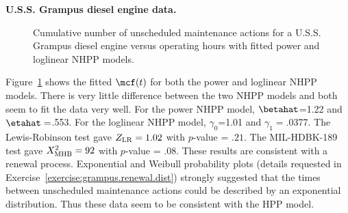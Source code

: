 \begin{example}
\label{example:grampus.nhpp}
{\bf U.S.S. Grampus diesel engine data.}
\begin{figure}
\caption{Cumulative number of unscheduled 
maintenance actions for a U.S.S. Grampus diesel engine versus operating
hours with fitted power and loglinear NHPP models.}
\label{figure:grampus.mcf.nhpp.plot.ps}
\end{figure}
Figure~\ref{figure:grampus.mcf.nhpp.plot.ps} shows the fitted
$\mcf(t)$ for both the power and loglinear NHPP models. 
There is very little difference between the two NHPP
models and both seem to fit the data very well.  For the power NHPP model,
$\betahat$=1.22 and $\etahat=$.553.  For the loglinear NHPP model,
$\gamma_{0}$=1.01 and $\gamma_{1}=$.0377.  The Lewis-Robinson test
gave $Z_{\rm LR}=1.02$ with $p$-value = $.21$.  The MIL-HDBK-189 test
gave $X^{2}_{\rm MHB}=92$ with $p$-value = .08. These results are
consistent with a renewal process. Exponential and Weibull probability
plots (details requested in
Exercise~\ref{exercise:grampus.renewal.dist}) strongly suggested that
the times between unscheduled maintenance actions could be described by an exponential
distribution.  Thus these data seem to be consistent with the HPP
model.
\end{example}

